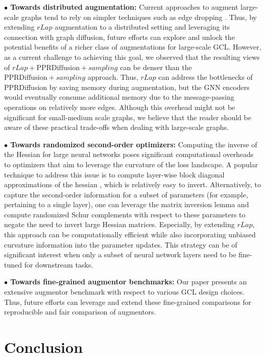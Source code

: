\documentclass{article}
\theoremstyle{plain}
\theoremstyle{definition}
\theoremstyle{remark}
\begin{document}
\textbf{$\bullet$ Towards distributed augmentation:} Current approaches to augment large-scale graphs tend to rely on  simpler techniques such as edge dropping \cite{thakoor2021bootstrapped}. Thus, by extending $rLap$ augmentation to a distributed setting and leveraging its connection with graph diffusion, future efforts can explore and unlock the potential benefits of a richer class of augmentations for large-scale GCL. However, as a current challenge to achieving this goal, we observed that the resulting views of $rLap+\text{PPRDiffusion}+sampling$ can be denser than the $\text{PPRDiffusion} + sampling$ approach. Thus, $rLap$ can address the bottlenecks of PPRDiffusion by saving memory during augmentation, but the GNN encoders would eventually consume additional memory due to the message-passing operations on relatively more edges. Although this overhead might not be significant for small-medium scale graphs, we believe that the reader should be aware of these practical trade-offs when dealing with large-scale graphs.

\textbf{$\bullet$ Towards randomized second-order optimizers:} Computing the inverse of the Hessian for large neural networks poses significant computational overheads to optimizers that aim to leverage the curvature of the loss landscape. A popular technique to address this issue is to compute layer-wise block diagonal approximations of the hessian \citep{martens2015optimizing, osawa2019large, hoefler2021sparsity}, which is relatively easy to invert. Alternatively, to capture the second-order information for a subset of parameters (for example, pertaining to a single layer), one can leverage the matrix inversion lemma and compute randomized Schur complements with respect to these parameters to negate the need to invert large Hessian matrices. Especially, by extending $rLap$, this approach can be computationally efficient while also incorporating unbiased curvature information into the parameter updates. This strategy can be of significant interest when only a subset of neural network layers need to be fine-tuned for downstream tasks.

\textbf{$\bullet$ Towards fine-grained augmentor benchmarks:} Our paper presents an extensive augmentor benchmark with respect to various GCL design choices. Thus, future efforts can leverage and extend these fine-grained comparisons for reproducible and fair comparison of augmentors.

\section{Conclusion}
\end{document}
